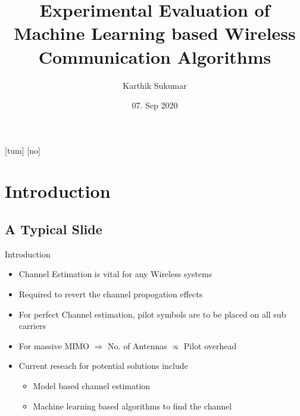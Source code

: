 \documentclass[10pt,t]{beamer}
\title{Experimental Evaluation of Machine Learning based Wireless Communication Algorithms}
\author[Karthik Sukumar (TUM)]{Karthik Sukumar}
\institute{\MSVname}
\date{07. Sep 2020}
\begin{document}
{ %
[tum]
[no]
\begin{frame}
\titlepage
\end{frame}
}

\section{Introduction}
\subsection{A Typical Slide}


\begin{frame}{Introduction}

    \begin{itemize}
        \item Channel Estimation is vital for any Wireless systems
        \item Required to revert the channel propogation effects

            \pause

        \item For perfect Channel estimation, pilot symbols are to be placed on all sub carriers
        \item For massive MIMO $\Rightarrow$ No. of Antennas $\propto$ Pilot overhead

            \pause
        \item Current reseach for potential solutions include
            \begin{itemize}
                \item Model based channel estimation %
                \item Machine learning based algorithms to find the channel
            \end{itemize}
    \end{itemize}


\end{frame}
\end{document}
